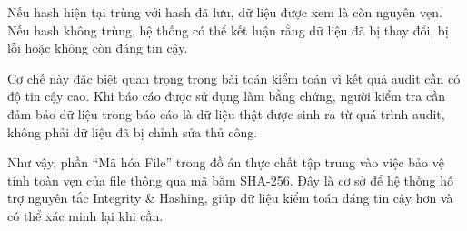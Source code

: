 Nếu hash hiện tại trùng với hash đã lưu, dữ liệu được xem là còn nguyên vẹn. Nếu hash không trùng, hệ thống có thể kết luận rằng dữ liệu đã bị thay đổi, bị lỗi hoặc không còn đáng tin cậy.

Cơ chế này đặc biệt quan trọng trong bài toán kiểm toán vì kết quả audit cần có độ tin cậy cao. Khi báo cáo được sử dụng làm bằng chứng, người kiểm tra cần đảm bảo dữ liệu trong báo cáo là dữ liệu thật được sinh ra từ quá trình audit, không phải dữ liệu đã bị chỉnh sửa thủ công.

Như vậy, phần ``Mã hóa File'' trong đồ án thực chất tập trung vào việc bảo vệ tính toàn vẹn của file thông qua mã băm SHA-256. Đây là cơ sở để hệ thống hỗ trợ nguyên tắc Integrity \& Hashing, giúp dữ liệu kiểm toán đáng tin cậy hơn và có thể xác minh lại khi cần.
